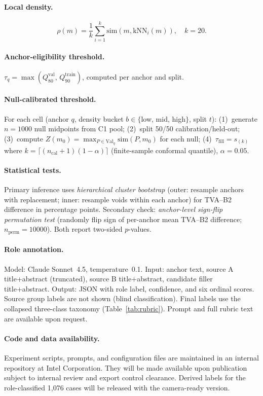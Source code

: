 \documentclass[11pt,twocolumn]{article}
\newcommand{\taufill}{\tau_{\mathrm{fill}}}
\newcommand{\tauanchor}{\tau_{q}}
\begin{document}
\paragraph{Local density.}
\[\rho(m) = \frac{1}{k}\sum_{i=1}^{k}\mathrm{sim}(m, \mathrm{kNN}_i(m)),\quad k{=}20.\]

\paragraph{Anchor-eligibility threshold.}
$\tauanchor = \max(Q_{80}^{\mathrm{val}},\, Q_{90}^{\mathrm{train}})$,
computed per anchor and split.

\paragraph{Null-calibrated threshold.}
For each cell (anchor $q$, density bucket $b \in \{$low, mid, high$\}$, split $t$):
(1)~generate $n{=}1000$ null midpoints from C1 pool;
(2)~split 50/50 calibration/held-out;
(3)~compute $Z(m_0) = \max_{P \in \mathrm{Val}_q}\mathrm{sim}(P,m_0)$ for each null;
(4)~$\taufill = s_{(k)}$ where $k = \lceil(n_\mathrm{cal}+1)(1-\alpha)\rceil$
(finite-sample conformal quantile), $\alpha{=}0.05$.

\paragraph{Statistical tests.}
Primary inference uses \emph{hierarchical cluster bootstrap} (outer: resample anchors
with replacement; inner: resample voids within each anchor) for TVA--B2 difference in
percentage points. Secondary check: \emph{anchor-level sign-flip permutation test}
(randomly flip sign of per-anchor mean TVA--B2 difference; $n_\mathrm{perm}{=}10000$).
Both report two-sided $p$-values.

\paragraph{Role annotation.}
Model: Claude Sonnet~4.5, temperature~0.1.
Input: anchor text, source A title+abstract (truncated), source B title+abstract,
candidate filler title+abstract.
Output: JSON with role label, confidence, and six ordinal scores.
Source group labels are not shown (blind classification).
Final labels use the collapsed three-class taxonomy (Table~\ref{tab:rubric}).
Prompt and full rubric text are available upon request.

\paragraph{Code and data availability.}
Experiment scripts, prompts, and configuration files are maintained in an
internal repository at Intel Corporation. They will be made available
upon publication subject to internal review and export control clearance.
Derived labels for the role-classified 1,076 cases will be released with the
camera-ready version.
\end{document}
